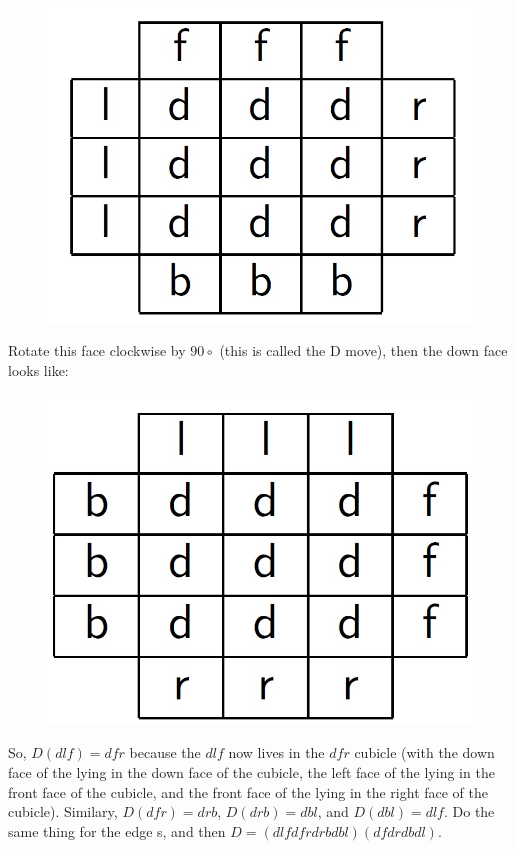 \begin{figure}[h]
	\centering	
		\includegraphics [scale=0.2]{input/pics/rubiks1.jpg}
			\caption{}
	\label{fig:rubiks1}
\end{figure}

Rotate this face clockwise by $90\circ$ (this is called the D move), then the down face looks like:

\begin{figure}[h]
	\centering
		\includegraphics[scale=0.2]{input/pics/rubiks2.jpg}
		\caption{}
	\label{fig:rubiks2}
\end{figure}

So, $D(dlf) = dfr$ because the $dlf$ \cpiece{} now lives in the $dfr$ cubicle (with the down face of the \cpiece{} lying in the down
face of the cubicle, the left face of the \cpiece{} lying in the front face of the cubicle, and the front face of the \cpiece{} lying
in the right face of the cubicle). Similary, $D(dfr) = drb$, $D(drb) = dbl$, and $D(dbl) = dlf$. Do the same thing
for the edge \cpiece{}s, and then $D = (dlf dfr drb dbl)(df dr db dl)$.

